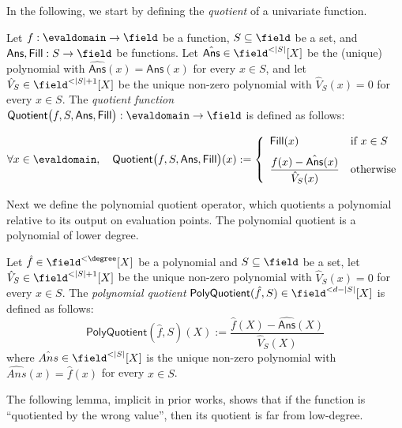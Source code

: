 In the following, we start by defining the \emph{quotient} of a univariate function.
\begin{definition}\label{def:quotient}
    Let $f:\evaldomain\to\field$ be a function, $S\subseteq\field$ be a set, and $\mathsf{Ans},\mathsf{Fill}: S\rightarrow\field$ be functions. Let $\hat{\mathsf{Ans}}\in\field^{<|S|}[X]$ be the (unique) polynomial with $\hat{\mathsf{Ans}}(x)=\mathsf{Ans}(x)$ for every $x\in S$, and let $\hat{V}_S\in\field^{<|S|+1}[X]$ be the unique non-zero polynomial with $\hat{V}_S(x)=0$ for every $x\in S$.
    The \emph{quotient function} $\mathsf{Quotient}\bigl(f,S,\mathsf{Ans},\mathsf{Fill}\bigr): \evaldomain\to\field$
    is defined as follows:

    \[
    \forall x \in \evaldomain, \quad
    \mathsf{Quotient}\bigl(f, S, \mathsf{Ans}, \mathsf{Fill} \bigr)(x)
    :=
    \left\{
    \begin{array}{ll}
        \mathsf{Fill}(x)
        & \text{if } x \in S \\[6pt]
        \dfrac{f(x) - \hat{\mathsf{Ans}}(x)}{\hat{V}_S(x)}
        & \text{otherwise}
    \end{array}
    \right.
    \]

\end{definition}

Next we define the polynomial quotient operator, which quotients a polynomial relative to its output on evaluation points. The polynomial quotient is a polynomial of lower degree.

\begin{definition}\label{def:poly_quotient}
    Let $\hat{f}\in\field^{<\degree}[X]$ be a polynomial and $S\subseteq\field$ be a set, let $\hat{V}_S\in\field^{<|S|+1}[X]$ be the unique non-zero polynomial with $\hat{V}_S(x)=0$ for every $x\in S$. The \emph{polynomial quotient} $\mathsf{PolyQuotient}(\hat{f},S)\in\field^{<d-|S|}[X]$ is defined as follows:
    \[
            \mathsf{PolyQuotient}(\hat{f},S)(X):=\frac{\hat{f}(X)-\hat{\mathsf{Ans}}(X)}{\hat{V}_S(X)}
    \]
where $\hat{Ans}\in\field^{<|S|}[X]$ is the unique non-zero polynomial with $\hat{Ans}(x)=\hat{f}(x)$ for every $x \in S$.
\end{definition}

The following lemma, implicit in prior works, shows that if the function is ``quotiented by the wrong value'', then its quotient is far from low-degree.

